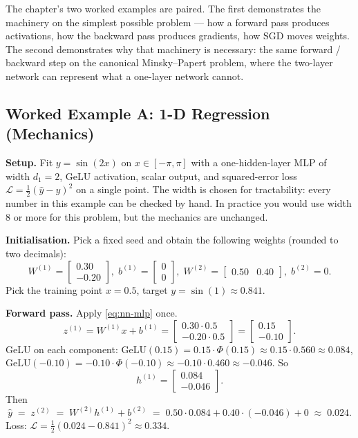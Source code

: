 The chapter's two worked examples are paired. The first
demonstrates the machinery on the simplest possible problem ---
how a forward pass produces activations, how the backward pass
produces gradients, how SGD moves weights. The second
demonstrates why that machinery is necessary: the same forward /
backward step on the canonical Minsky--Papert problem, where the
two-layer network can represent what a one-layer network cannot.

\subsection{Worked Example A: 1-D Regression (Mechanics)}

\begin{workedexample}

\textbf{Setup.} Fit $y = \sin(2x)$ on $x \in [-\pi, \pi]$ with a
one-hidden-layer MLP of width $d_1 = 2$, GeLU activation, scalar
output, and squared-error loss
$\mathcal{L} = \tfrac{1}{2}(\hat y - y)^2$ on a single point.
The width is chosen for tractability: every number in this
example can be checked by hand. In practice you would use width
$8$ or more for this problem, but the mechanics are unchanged.

\textbf{Initialisation.} Pick a fixed seed and obtain the
following weights (rounded to two decimals):
\[
  W^{(1)} = \begin{bmatrix} 0.30 \\ -0.20 \end{bmatrix}, \;
  b^{(1)} = \begin{bmatrix} 0 \\ 0 \end{bmatrix}, \;
  W^{(2)} = \begin{bmatrix} 0.50 & 0.40 \end{bmatrix}, \;
  b^{(2)} = 0.
\]
Pick the training point $x = 0.5$, target $y = \sin(1) \approx 0.841$.

\textbf{Forward pass.} Apply \eqref{eq:nn-mlp} once.
\[
  z^{(1)} = W^{(1)} x + b^{(1)}
  = \begin{bmatrix} 0.30 \cdot 0.5 \\ -0.20 \cdot 0.5 \end{bmatrix}
  = \begin{bmatrix} 0.15 \\ -0.10 \end{bmatrix}.
\]
GeLU on each component:
$\mathrm{GeLU}(0.15) = 0.15 \cdot \Phi(0.15) \approx 0.15 \cdot 0.560 \approx 0.084$,
$\mathrm{GeLU}(-0.10) = -0.10 \cdot \Phi(-0.10) \approx -0.10 \cdot 0.460 \approx -0.046$.
So
\[
  h^{(1)}
  = \begin{bmatrix} 0.084 \\ -0.046 \end{bmatrix}.
\]
Then
\[
  \hat y \;=\; z^{(2)}
  \;=\; W^{(2)} h^{(1)} + b^{(2)}
  \;=\; 0.50 \cdot 0.084 + 0.40 \cdot (-0.046) + 0
  \;\approx\; 0.024.
\]
Loss: $\mathcal{L} = \tfrac{1}{2}(0.024 - 0.841)^2 \approx 0.334$.


\end{workedexample}
